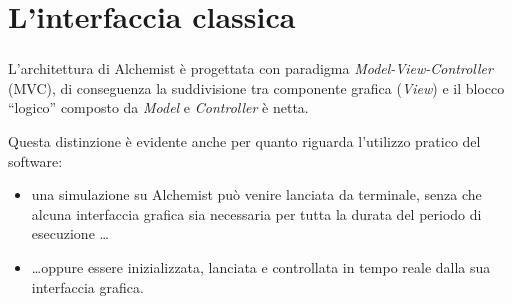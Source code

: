 \documentclass[%
]{beamer}
\newcommand{\engEmph}[1] {\emph{\foreignlanguage{english}#1}}
\begin{document}
    \section{L'interfaccia classica}\label{sec:old}
    \begin{frame}
        \frametitle{\insertsection}
        L'architettura di Alchemist è progettata con paradigma \engEmph{Model-View-Controller} (MVC), di conseguenza la suddivisione tra componente grafica (\engEmph{View}) e il blocco ``logico'' composto da \engEmph{Model} e \engEmph{Controller} è netta.

        \medskip
        \pause

        Questa distinzione è evidente anche per quanto riguarda l'utilizzo pratico del software:

        \begin{itemize}[<+(1)->]
          \item
              una simulazione su Alchemist può venire lanciata da terminale, senza che alcuna interfaccia grafica sia necessaria per tutta la durata del periodo di esecuzione \ldots

          \item
              \ldots oppure essere inizializzata, lanciata e controllata in tempo reale dalla sua interfaccia grafica.
        \end{itemize}
    \end{frame}

    \begin{frame}
        \frametitle{\insertsection}
        \centering
    \end{frame}
\end{document}
